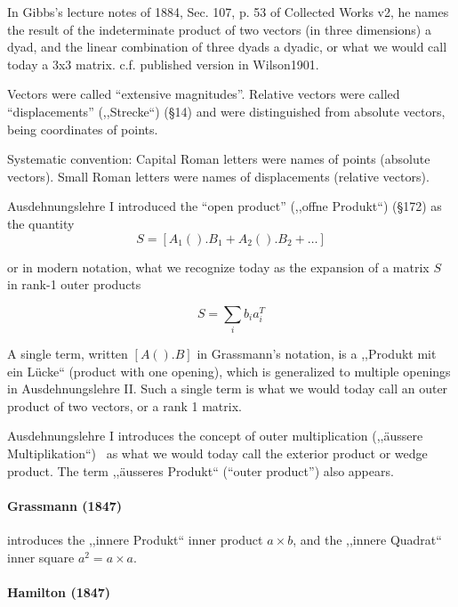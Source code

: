 In Gibbs's lecture notes of 1884, Sec. 107, p. 53 of Collected Works v2, he names the result of the indeterminate product of two vectors (in three dimensions) a dyad, and the linear combination of three dyads a dyadic, or what we would call today a 3x3 matrix. c.f. published version in Wilson1901.

Vectors were called ``extensive magnitudes''. Relative vectors were called ``displacements'' (,,Strecke``) (\S 14) and were distinguished from absolute vectors, being coordinates of points.

Systematic convention: Capital Roman letters were names of points (absolute vectors). Small Roman letters were names of displacements (relative vectors).

Ausdehnungslehre I introduced the ``open product'' (,,offne Produkt``) (\S 172) as the quantity
\[
S = [A_1().B_1 + A_2().B_2 + \dots]
\]

or in modern notation, what we recognize today as the expansion of a matrix $S$ in rank-1 outer products

\[
S = \sum_i b_i a_i^T
\]

A single term, written $[A().B]$ in Grassmann's notation, is a ,,Produkt mit ein Lücke`` (product with one opening), which is generalized to multiple openings in Ausdehnungslehre II. Such a single term is what we would today call an outer product of two vectors, or a rank 1 matrix.

Ausdehnungslehre I introduces the concept of outer multiplication (,,äussere Multiplikation``)~\cite[\S 34, p.57]{Grassmann1844}\cite[p. 81]{Grassmann1995} as what we would today call the exterior product or wedge product. The term ,,äusseres Produkt``\cite[\S 36, p. 60]{Grassmann1844} (``outer product''\cite[p. 84]{Grassmann1995}) also appears.

\paragraph{Grassmann (1847)~\cite{Grassmann1847,Grassmann1995}}

\cite[p. 16]{Grassmann1847}\cite[\S 7, p. 334]{Grassmann1995} introduces the
 ,,innere Produkt`` inner product $a \times b$, and the
 ,,innere Quadrat`` inner square $a^2 = a \times a$.

\paragraph{Hamilton (1847)~\cite{Hamilton1847}}

